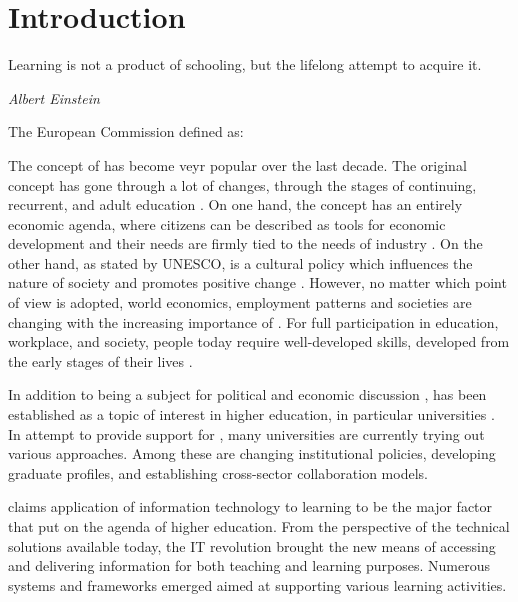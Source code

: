 \chapter{Introduction\label{cha:intro}}
\epigraph{Learning is not a product of schooling, but the lifelong attempt to
acquire it.}{\textit{Albert Einstein}}
\noindent

The European Commission \citeyearpar{EuropeanCommission2000} defined \LLLs as:


The concept of \LLLs has become veyr popular over the last decade. The original
concept has gone through a lot of changes, through the stages of continuing,
recurrent, and adult education \citep{Jarvis2004}. On one hand, the \LLLs
concept has an entirely economic agenda, where citizens can be described
as tools for economic development and their needs are firmly tied to the needs
of industry \citep[pp.~112-114]{Carter2008}. On the other hand, as stated by
UNESCO, \LLLs is a cultural policy which influences the nature of society and
promotes positive change \citep[pp.~12-14]{Boshier2000}. However, no matter
which point of view is adopted, world economics, employment patterns and
societies are changing with the increasing importance of \LLLs
\citep{Jarvis2008,Simmons-McDonald2009}. For full participation in education,
workplace, and society, people today require well-developed \LLLs skills,
developed from the early stages of their lives \citep{Otala1997}.

In addition to being a subject for political and economic discussion
\citep{Bagnall2009}, \LLLs has been established as a topic of interest in
higher education, in particular universities \citep{Knapper2000}. In attempt to
provide support for \LLLsn, many universities are currently trying out various
approaches. Among these are changing institutional policies, developing graduate
profiles, and establishing cross-sector collaboration models.

\citet{Duke2001} claims application of information technology to learning to be
the major factor that put \LLLs on the agenda of higher education. From the
perspective of the technical solutions available today, the IT revolution
brought the new means of accessing and delivering information for both teaching
and learning purposes. Numerous systems and frameworks emerged aimed at
supporting various learning activities. 

